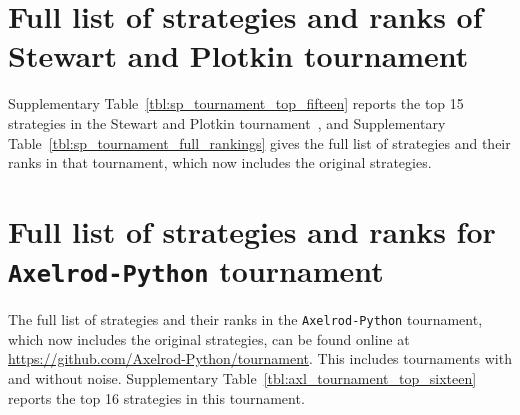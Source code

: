 \documentclass{article}
\newcommand{\AXL}{\texttt{Axelrod-Python}}
\begin{document}
\section{Full list of strategies and ranks of Stewart and Plotkin tournament}\label{app:stewart_and_plotkin}

Supplementary Table~\ref{tbl:sp_tournament_top_fifteen} reports the top 15
strategies in the Stewart and Plotkin tournament~\cite{Stewart2012}, and
Supplementary Table~\ref{tbl:sp_tournament_full_rankings} gives the full list of
strategies and their ranks in that tournament, which now includes the original
strategies.

\begin{table}[!hbtp]
        \centering
        \resizebox{.8\textwidth}{!}{
        }
        \caption{\textbf{Top 15 strategies in the Stewart and Plotkin tournament.}
        We report the mean score, rank, and mean cooperation rate. For comparison,
        we also include the cooperation rate from our reproduced tournament,
        alongside the cooperation rates originally reported by Stewart and Plotkin.}
        \label{tbl:sp_tournament_top_fifteen}
\end{table}

\begin{table}[!hbtp]
        \resizebox{\textwidth}{.5\textheight}{
        \centering
        }
        \caption{Stewart and Plotkin tournament full list of rankings.}
        \label{tbl:sp_tournament_full_rankings}
\end{table}


\section{Full list of strategies and ranks for \AXL{} tournament}\label{app:axl}

The full list of strategies and their ranks in the \AXL{} tournament, which now
includes the original strategies, can be found online at
\url{https://github.com/Axelrod-Python/tournament}.
This includes tournaments with and without noise.
Supplementary Table~\ref{tbl:axl_tournament_top_sixteen} reports the top 16
strategies in this tournament.

\begin{table}[!hbtp]
    \centering
    \resizebox{.9\textwidth}{!}{
    }
    \caption{\textbf{Top 16 strategies in the \AXL{} tournament.} This
    tournament includes all strategies from the \AXL{} library alongside the
    original Fortran strategies. In total, there are 272 strategies competing.
    Strategies denoted by $^\dagger$ were not designed but, they were trained
    via reinforcement learning, as described in~\cite{Harper2017}.}
    \label{tbl:axl_tournament_top_sixteen}
\end{table}
\end{document}
